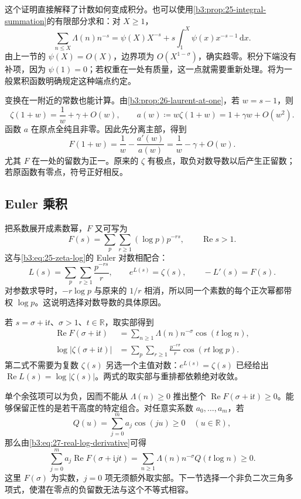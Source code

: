 这个证明直接解释了计数如何变成积分。也可以使用\cref{b3:prop:25-integral-summation}的有限部分求和：对 \(X\ge1\)，
\[
 \sum_{n\le X}\Lambda(n)n^{-s}
 =\psi(X)X^{-s}
   +s\int_1^X\psi(x)x^{-s-1}\,\mathrm dx.
\]
由上一节的 \(\psi(X)=O(X)\)，边界项为 \(O(X^{1-\sigma})\)，确实趋零。积分下端没有补项，因为 \(\psi(1)=0\)；若权重在一处有质量，这一点就需要重新处理。将为一般累积函数明确规定这种端点约定。

变换在一附近的常数也能计算。由\cref{b3:prop:26-laurent-at-one}，若 \(w=s-1\)，则
\[
 \zeta(1+w)=\frac1w+\gamma+O(w),\qquad
 a(w)\coloneqq w\zeta(1+w)=1+\gamma w+O(w^2).
\]
函数 \(a\) 在原点全纯且非零。因此先分离主部，得到
\begin{equation}\label{b3:eq:27-log-derivative-pole}
 F(1+w)=\frac1w-\frac{a'(w)}{a(w)}
        =\frac1w-\gamma+O(w).
\end{equation}
尤其 \(F\) 在一处的留数为正一。原来的 \(\zeta\) 有极点，取负对数导数以后产生正留数；若原函数有零点，符号正好相反。

\subsection{Euler 乘积}
\label{b3:subsec:270202}

把系数展开成素数幂，\(F\) 又可写为
\[
 F(s)=\sum_p\sum_{r\ge1}(\log p)p^{-rs},
 \qquad \operatorname{Re}s>1.
\]
这与\eqref{b3:eq:25-zeta-log}的 Euler 对数相配合：
\[
 L(s)=\sum_p\sum_{r\ge1}\frac{p^{-rs}}r,
 \qquad e^{L(s)}=\zeta(s),\qquad -L'(s)=F(s).
\]
对参数求导时，\(-r\log p\) 与原来的 \(1/r\) 相消，所以同一个素数的每个正次幂都带权 \(\log p\)。这说明选择对数导数的具体原因。

若 \(s=\sigma+\mathrm it\)、\(\sigma>1\)、\(t\in\mathbb R\)，取实部得到
\begin{align}
 \operatorname{Re}F(\sigma+\mathrm it)
 &=\sum_{n\ge1}\Lambda(n)n^{-\sigma}\cos(t\log n),
 \label{b3:eq:27-real-log-derivative}\\
 \log|\zeta(\sigma+\mathrm it)|
 &=\sum_p\sum_{r\ge1}\frac{p^{-r\sigma}}r
                                      \cos(rt\log p).
 \label{b3:eq:27-log-modulus}
\end{align}
第二式不需要为复数 \(\zeta(s)\) 另选一个主值对数：\(e^{L(s)}=\zeta(s)\) 已经给出 \(\operatorname{Re}L(s)=\log|\zeta(s)|\)。两式的取实部与重排都依赖绝对收敛。

单个余弦项可以为负，因而不能从 \(\Lambda(n)\ge0\) 推出整个 \(\operatorname{Re}F(\sigma+\mathrm it)\ge0\)。能够保留正性的是若干高度的特定组合。对任意实系数 \(a_0,\ldots,a_m\)，若
\[
 Q(u)=\sum_{j=0}^m a_j\cos(ju)\ge0
 \quad(u\in\mathbb R),
\]
那么由\eqref{b3:eq:27-real-log-derivative}可得
\[
 \sum_{j=0}^m a_j\operatorname{Re}F(\sigma+\mathrm ijt)
 =\sum_{n\ge1}\Lambda(n)n^{-\sigma}Q(t\log n)\ge0.
\]
这里 \(F(\sigma)\) 为实数，\(j=0\) 项无须额外取实部。下一节选择一个非负二次三角多项式，使潜在零点的负留数无法与这个不等式相容。

